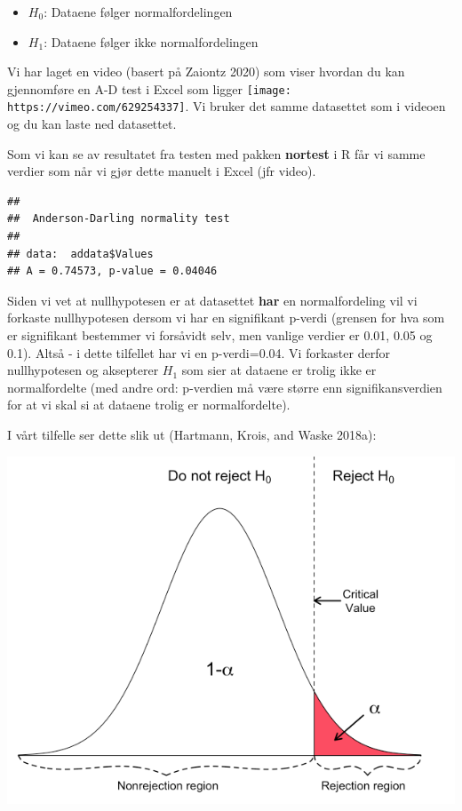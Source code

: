 \documentclass[
]{book}
\providecommand{\tightlist}{%
  \setlength{\itemsep}{0pt}\setlength{\parskip}{0pt}}
\begin{document}
\begin{itemize}
\tightlist
\item
  \(H_0\): Dataene følger normalfordelingen
\item
  \(H_1\): Dataene følger ikke normalfordelingen
\end{itemize}

Vi har laget en video (basert på Zaiontz 2020) som viser hvordan du kan gjennomføre en A-D test i Excel som ligger \texttt{[image: https://vimeo.com/629254337]}. Vi bruker det samme datasettet som i videoen og du kan laste ned datasettet.

Som vi kan se av resultatet fra testen med pakken \textbf{nortest} i R får vi samme verdier som når vi gjør dette manuelt i Excel (jfr video).

\begin{verbatim}
## 
##  Anderson-Darling normality test
## 
## data:  addata$Values
## A = 0.74573, p-value = 0.04046
\end{verbatim}

Siden vi vet at nullhypotesen er at datasettet \textbf{har} en normalfordeling vil vi forkaste nullhypotesen dersom vi har en signifikant p-verdi (grensen for hva som er signifikant bestemmer vi forsåvidt selv, men vanlige verdier er 0.01, 0.05 og 0.1). Altså - i dette tilfellet har vi en p-verdi=0.04. Vi forkaster derfor nullhypotesen og aksepterer \(H_1\) som sier at dataene er trolig ikke er normalfordelte (med andre ord: p-verdien må være større enn signifikansverdien for at vi skal si at dataene trolig er normalfordelte).

I vårt tilfelle ser dette slik ut (Hartmann, Krois, and Waske 2018a):

\includegraphics{Hartman1.png}
\end{document}
